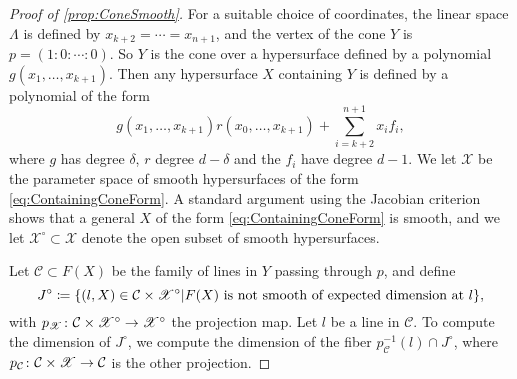 \begin{proof}[Proof of \cref{prop:ConeSmooth}]
	For a suitable choice of coordinates, the linear space $\Lambda$ is defined by $x_{k+2} = \cdots = x_{n+1}$, and the vertex of the cone $Y$ is $p = (1:0:\cdots:0)$. So $Y$ is the cone over a hypersurface defined by a polynomial $g(x_1,\dots,x_{k+1})$. Then any hypersurface $X$ containing $Y$ is defined by a polynomial of the form
	\begin{equation}
		\label{eq:ContainingConeForm}
		g(x_1,\dots,x_{k+1})r(x_0,\dots,x_{k+1}) + \sum_{i=k+2}^{n+1} x_i f_i,
	\end{equation}
	where $g$ has degree $\delta$, $r$ degree $d-\delta$ and the $f_i$ have degree $d-1$. We let $\mathscr{X}$ be the parameter space of smooth hypersurfaces of the form \eqref{eq:ContainingConeForm}. A standard argument using the Jacobian criterion shows that a general $X$ of the form \eqref{eq:ContainingConeForm} is smooth, and we let $\mathscr{X}^\circ \subset \mathscr{X}$ denote the open subset of smooth hypersurfaces.
	
	Let ${\mathcal{C}} \subset F(X)$ be the family of lines in $Y$ passing through $p$, and define
	\[J^\circ \coloneqq \lbrace(l,X) \in {\mathcal{C}} \times \mathscr{X}^\circ \vert F(X) \text{ is not smooth of expected dimension at } l\rbrace,\]
	with $p_{\mathscr{X}} \colon {\mathcal{C}} \times \mathscr{X}^\circ \to \mathscr{X}^\circ$ the projection map. Let $l$ be a line in ${\mathcal{C}}$. To compute the dimension of $J^\circ$, we compute the dimension of the fiber $p_{\mathcal{C}}^{-1}(l) \cap J^\circ$, where $p_{\mathcal{C}} \colon {\mathcal{C}} \times \mathscr{X} \to {\mathcal{C}}$ is the other projection.


\end{proof}
